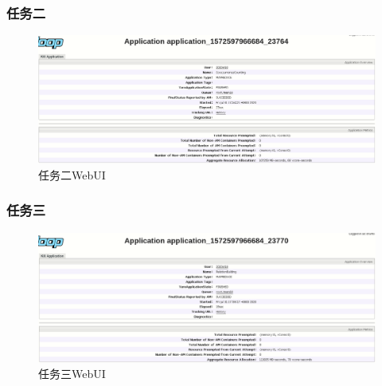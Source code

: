 \documentclass[a4paper,UTF8]{article}
\numberwithin{equation}{section}
\begin{document}
\subsubsection{任务二}
\begin{figure}[H]
    \centering
    \includegraphics[width = 15cm]{task2-1-success.png}
    \caption{任务二WebUI}
\end{figure}

\subsubsection{任务三}
\begin{figure}[H]
    \centering
    \includegraphics[width = 15cm]{task3-1-success.png}
    \caption{任务三WebUI}
\end{figure}
\end{document}
